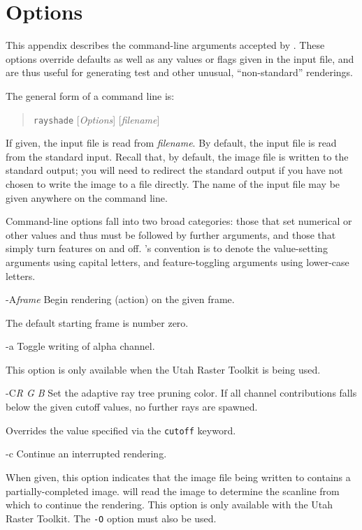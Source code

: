 \chapter{Options}

This appendix describes the command-line arguments accepted by {\rayshade}.
These options override defaults
as well as any values or flags given in the input file,
and are thus useful for generating test and other unusual, ``non-standard''
renderings.

The general form of a {\rayshade} command line is:
\begin{quote}
{\tt rayshade} [{\em Options}] [{\em filename}]
\end{quote}

If given, the input file is read from {\em filename}.  By default,
the input file is read from the standard input.
Recall that, by default, the image file is written to the standard
output; you will need to redirect the standard output if you have not
chosen to write the image to a file directly.  The name of the input
file may be given anywhere on the command line.

Command-line options fall into two broad categories: those that set
numerical or other values and thus must be followed by further arguments,
and those that simply turn features on and off.  {\Rayshade}'s
convention is to denote the value-setting arguments using capital letters,
and feature-toggling arguments using lower-case letters.

\begin{defkey}{-A}{{\em frame}}
	Begin rendering (action) on the given frame.
\end{defkey}
The default starting frame is number zero.

\begin{defkey}{-a}{}
	Toggle writing of alpha channel.
\end{defkey}
This option is only available when the Utah Raster Toolkit is
being used.

\begin{defkey}{-C}{{\em R G B}}
	Set the adaptive ray tree pruning color.  If all
	channel contributions falls below the given cutoff
	values, no further rays are spawned.
\end{defkey}
Overrides the value specified via the {\tt cutoff} keyword.

\begin{defkey}{-c}{}
	Continue an interrupted rendering.
\end{defkey}
When given, this option indicates that the image file being written
to contains a partially-completed image.  {\Rayshade} will read the
image to determine the scanline from which to continue the rendering.
This option is only available with the Utah Raster Toolkit.
The {\tt -O} option must also be used.

